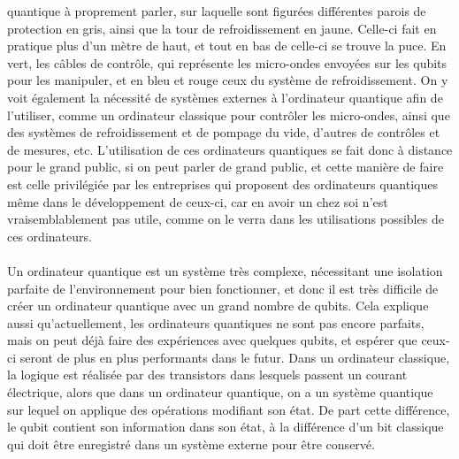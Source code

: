 quantique à proprement parler, sur laquelle sont figurées différentes parois de
protection en gris, ainsi que la tour de refroidissement en jaune.
Celle-ci fait en pratique plus d'un mètre de haut, et tout en bas de celle-ci se trouve
la puce.
En vert, les câbles de contrôle, qui représente les micro-ondes envoyées sur
les qubits pour les manipuler, et en bleu et rouge ceux du système de refroidissement.
On y voit également la nécessité de systèmes externes à l'ordinateur quantique afin
de l'utiliser, comme un ordinateur classique pour contrôler les micro-ondes,
ainsi que des systèmes de refroidissement et de pompage du vide, d'autres
de contrôles et de mesures, etc.
L'utilisation de ces ordinateurs quantiques se fait donc à distance pour le grand
public, si on peut parler de grand public, et cette manière de faire est celle
privilégiée par les entreprises qui proposent des ordinateurs quantiques même dans
le développement de ceux-ci, car en avoir un chez soi n'est vraisemblablement pas
utile, comme on le verra dans les utilisations possibles de ces ordinateurs.\\ \\
Un ordinateur quantique est un système très complexe, nécessitant une isolation
parfaite de l'environnement pour bien fonctionner, et donc il est très difficile
de créer un ordinateur quantique avec un grand nombre de qubits.
Cela explique aussi qu'actuellement, les ordinateurs quantiques ne sont pas encore
parfaits, mais on peut déjà faire des expériences avec quelques qubits, et
espérer que ceux-ci seront de plus en plus performants dans le futur.
Dans un ordinateur classique, la logique est réalisée par des transistors dans lesquels
passent un courant électrique, alors que dans un ordinateur quantique, on a un
système quantique sur lequel on applique des opérations modifiant son état.
De part cette différence, le qubit contient son information dans son état, à la
différence d'un bit classique qui doit être enregistré dans un système externe
pour être conservé.